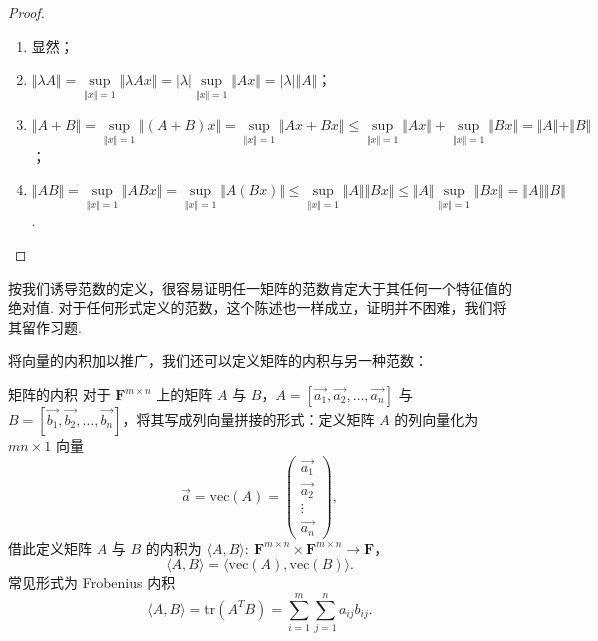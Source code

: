 \begin{proof}
    \begin{enumerate}
        \item 显然；
        \item $\Vert \lambda A\Vert=\sup\limits_{\Vert x\Vert =  1}\Vert \lambda Ax\Vert = \vert\lambda\vert \sup\limits_{\Vert x\Vert = 1}\Vert Ax\Vert = \vert\lambda\vert \Vert A\Vert$；
        \item $\Vert A+B\Vert=\sup\limits_{\Vert x\Vert = 1}\Vert (A+B)x\Vert = \sup\limits_{\Vert x\Vert = 1}\Vert Ax + Bx\Vert\leqslant\sup\limits_{\Vert x\Vert = 1}\Vert Ax\Vert+\sup\limits_{\Vert x\Vert = 1}\Vert Bx\Vert=\Vert A\Vert+\Vert B\Vert$；
        \item $\Vert AB\Vert=\sup\limits_{\Vert x\Vert = 1}\Vert ABx\Vert=\sup\limits_{\Vert x\Vert = 1}\Vert A(Bx)\Vert\leqslant\sup\limits_{\Vert x\Vert = 1}\Vert A\Vert\Vert Bx\Vert\leqslant\Vert A\Vert\sup\limits_{\Vert x\Vert = 1}\Vert Bx\Vert=\Vert A\Vert\Vert B\Vert$.
    \end{enumerate}
\end{proof}

按我们诱导范数的定义，很容易证明任一矩阵的范数肯定大于其任何一个特征值的绝对值. 对于任何形式定义的范数，这个陈述也一样成立，证明并不困难，我们将其留作习题.


将向量的内积加以推广，我们还可以定义矩阵的内积与另一种范数：

\begin{definition}{矩阵的内积}{}
    对于 $\mathbf{F}^{m\times n}$ 上的矩阵 $A$ 与 $B$，$A = \left[\vec{a_1}, \vec{a_2}, \dots, \vec{a_n}\right]$ 与 $B = \left[\vec{b_1}, \vec{b_2}, \dots, \vec{b_n}\right]$，将其写成列向量拼接的形式：定义矩阵 $A$ 的\textrm{列向量化}为$mn \times 1$ 向量 \[\vec{a} = \mathrm{vec}(A) = \begin{pmatrix} \vec{a_1} \\ \vec{a_2} \\ \vdots \\ \vec{a_n} \end{pmatrix},\]
    借此定义矩阵 $A$ 与 $B$ 的内积为 $\langle A, B\rangle \colon\ \mathbf{F}^{m\times n}\times\mathbf{F}^{m\times n}\to\mathbf{F}$，\[\langle A, B\rangle = \langle \mathrm{vec}(A), \mathrm{vec}(B)\rangle.\]
    常见形式为 Frobenius 内积 \[\langle A, B\rangle = \mathrm{tr}(A^{T}B) = \sum_{i=1}^{m}\sum_{j=1}^{n}a_{ij}b_{ij}.\]
\end{definition}

